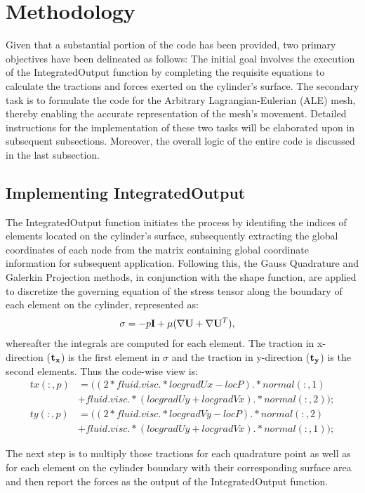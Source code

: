 \documentclass[a4paper,12pt]{article} %
\begin{document}
\section*{Methodology}
Given that a substantial portion of the code has been provided, two primary objectives have been delineated 
as follows: The initial goal involves the execution of the IntegratedOutput function by completing the requisite 
equations to calculate the tractions and forces exerted on the cylinder's surface. The secondary task is to 
formulate the code for the Arbitrary Lagrangian-Eulerian (ALE) mesh, thereby enabling 
the accurate representation of the mesh's movement. Detailed instructions for the implementation of these 
two tasks will be elaborated upon in subsequent subsections. Moreover, the overall logic of the entire code is 
discussed in the last subsection.

\subsection*{Implementing IntegratedOutput}
The IntegratedOutput function initiates the process by identifing the indices of elements located on the cylinder's 
surface, subsequently extracting the global coordinates of each node from the matrix containing global coordinate 
information for subsequent application. Following this, the Gauss Quadrature and Galerkin Projection methods, 
in conjunction with the shape function, are applied to discretize the governing equation of the stress tensor 
along the boundary of each element on the cylinder, represented as:
\begin{align*}
    \mathbf{\sigma} &= -p\mathbf{I} + \mu(\nabla \mathbf{U} + \nabla \mathbf{U}^T),
\end{align*}
whereafter the integrals are computed for each element. The traction in x-direction ($\mathbf{t_x}$) is the first 
element in $\sigma$ and the traction in y-direction ($\mathbf{t_y}$) is the second elements. Thus the code-wise view is:
\begin{align*}
    tx(:,p) &= ((2*fluid.visc.*locgradUx-locP).*normal(:,1)\\
    & + fluid.visc.*(locgradUy+locgradVx).*normal(:,2));\\
    ty(:,p) &= ((2*fluid.visc.*locgradVy-locP).*normal(:,2)\\
    & + fluid.visc.*(locgradUy+locgradVx).*normal(:,1));
\end{align*}

The next step is to multiply those tractions for each quadrature point as well as for each element on the cylinder 
boundary with their corresponding surface area and then report the forces as the output of the IntegratedOutput function.
\end{document}

